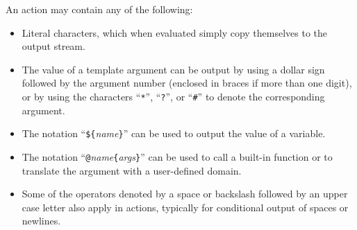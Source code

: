 An action may contain any of the following:
\begin{itemize}
\item Literal characters, which when evaluated simply copy themselves to
the output stream.
\item The value of a template argument can be output by using a dollar
sign followed by the argument number (enclosed in braces if more than
one digit), or by using the characters ``\verb/*/'', ``\verb/?/'',
or ``\verb/#/'' to denote the corresponding argument.
\item The notation ``\verb/${/{\em name}\verb/}/'' can be used to output
the value of a variable.
\item The notation ``\verb/@/{\em name}\verb/{/{\em args}\verb/}/'' can
be used to call a built-in function or to translate the argument with a
user-defined domain.
\item Some of the operators denoted by a space or backslash followed by an upper
case letter also apply in actions, typically for conditional output of
spaces or newlines.
\end{itemize}
